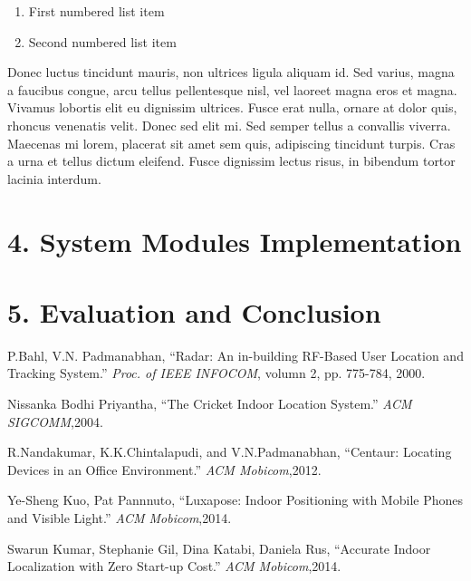 \documentclass[a4paper, 11pt]{article} %
\begin{document}
\begin{enumerate}
\item First numbered list item
\item Second numbered list item
\end{enumerate}

Donec luctus tincidunt mauris, non ultrices ligula aliquam id. Sed varius, magna a faucibus congue, arcu tellus pellentesque nisl, vel laoreet magna eros et magna. Vivamus lobortis elit eu dignissim ultrices. Fusce erat nulla, ornare at dolor quis, rhoncus venenatis velit. Donec sed elit mi. Sed semper tellus a convallis viverra. Maecenas mi lorem, placerat sit amet sem quis, adipiscing tincidunt turpis. Cras a urna et tellus dictum eleifend. Fusce dignissim lectus risus, in bibendum tortor lacinia interdum.


\section*{4. System Modules Implementation}


\section*{5. Evaluation and Conclusion}


\begin{thebibliography}{10}
	
P.Bahl, V.N. Padmanabhan,
``Radar: An in-building RF-Based User Location and Tracking System.''
\textit{Proc. of IEEE INFOCOM}, volumn 2, pp. 775-784, 2000.

Nissanka Bodhi Priyantha,
``The Cricket Indoor Location System.''
\textit{ACM SIGCOMM},2004.

R.Nandakumar, K.K.Chintalapudi, and V.N.Padmanabhan,
``Centaur: Locating Devices in an Office Environment.''
\textit{ACM Mobicom},2012.

Ye-Sheng Kuo, Pat Pannnuto,
``Luxapose: Indoor Positioning with Mobile Phones and Visible Light.''
\textit{ACM Mobicom},2014.

Swarun Kumar, Stephanie Gil, Dina Katabi, Daniela Rus,
``Accurate Indoor Localization with Zero Start-up Cost.''
\textit{ACM Mobicom},2014.
\end{thebibliography}

\end{document}
